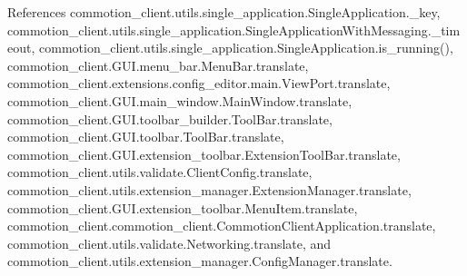 References commotion\+\_\+client.\+utils.\+single\+\_\+application.\+Single\+Application.\+\_\+key, commotion\+\_\+client.\+utils.\+single\+\_\+application.\+Single\+Application\+With\+Messaging.\+\_\+timeout, commotion\+\_\+client.\+utils.\+single\+\_\+application.\+Single\+Application.\+is\+\_\+running(), commotion\+\_\+client.\+G\+U\+I.\+menu\+\_\+bar.\+Menu\+Bar.\+translate, commotion\+\_\+client.\+extensions.\+config\+\_\+editor.\+main.\+View\+Port.\+translate, commotion\+\_\+client.\+G\+U\+I.\+main\+\_\+window.\+Main\+Window.\+translate, commotion\+\_\+client.\+G\+U\+I.\+toolbar\+\_\+builder.\+Tool\+Bar.\+translate, commotion\+\_\+client.\+G\+U\+I.\+toolbar.\+Tool\+Bar.\+translate, commotion\+\_\+client.\+G\+U\+I.\+extension\+\_\+toolbar.\+Extension\+Tool\+Bar.\+translate, commotion\+\_\+client.\+utils.\+validate.\+Client\+Config.\+translate, commotion\+\_\+client.\+utils.\+extension\+\_\+manager.\+Extension\+Manager.\+translate, commotion\+\_\+client.\+G\+U\+I.\+extension\+\_\+toolbar.\+Menu\+Item.\+translate, commotion\+\_\+client.\+commotion\+\_\+client.\+Commotion\+Client\+Application.\+translate, commotion\+\_\+client.\+utils.\+validate.\+Networking.\+translate, and commotion\+\_\+client.\+utils.\+extension\+\_\+manager.\+Config\+Manager.\+translate.



